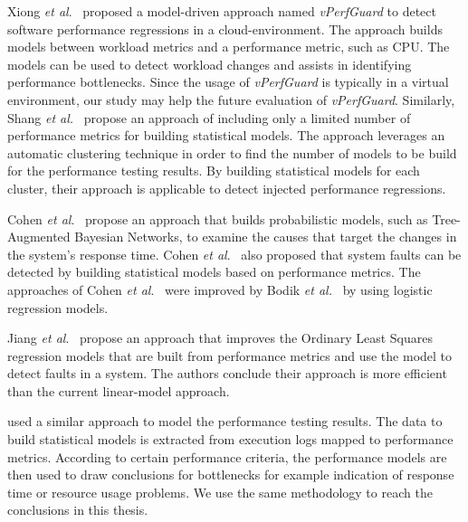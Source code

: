 Xiong \textit{et al$.$}~\cite{xiong2013vperfguard} proposed a model-driven approach named \textit{vPerfGuard} to detect software performance regressions in a cloud-environment. The approach builds models between workload metrics and a performance metric, such as CPU. The models can be used to detect workload changes and assists in identifying performance bottlenecks. Since the usage of \emph{vPerfGuard} is typically in a virtual environment, our study may help the future evaluation of \textit{vPerfGuard}. Similarly, Shang\textit{ et al.}~\cite{Shang:2015:ADP:2668930.2688052} propose an approach of including only a limited number of performance metrics for building statistical models. The approach leverages an automatic clustering technique in order to find the number of models to be build for the performance testing results. By building statistical models for each cluster, their approach is applicable to detect injected performance regressions. %


Cohen \textit{et al$.$}~\cite{cohen2004correlating} propose an approach that builds probabilistic models, such as Tree-Augmented Bayesian Networks, to examine the causes that target the changes in the system's response time. Cohen \textit{et al$.$}~\cite{Cohen:2005:CIC:1095810.1095821} also proposed that system faults can be detected by building statistical models based on performance metrics. The approaches of Cohen \textit{et al$.$}~\cite{cohen2004correlating, Cohen:2005:CIC:1095810.1095821} were improved by Bodik \textit{et al.}~\cite{bodik2008hilighter} by using logistic regression models.

Jiang \emph{et al$.$}~\cite{Jiang:2009:SMM:1555228.1555233} propose an approach that improves the Ordinary Least Squares regression models that are built from performance metrics and use the model to detect faults in a system. The authors conclude their approach is more efficient than the current linear-model approach.

\cite{Jiang:2010:AAL:1831708.1831726} used a similar approach to model the performance testing results. The data to build statistical models is extracted from execution logs mapped to performance metrics. According to certain performance criteria, the performance models are then used to draw conclusions for bottlenecks for example indication of response time or resource usage problems. We use the same methodology to reach the conclusions in this thesis.

